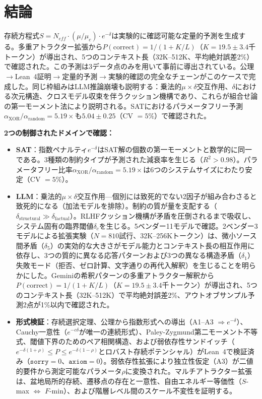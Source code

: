 \documentclass[11pt,a4paper]{article}
\begin{document}
\section{結論}
\label{sec:conclusion}

存続方程式$S = N_{eff} \cdot (\mu/\mu_c) \cdot e^{-\delta}$は実験的に確認可能な定量的予測を生成する。多重アトラクター拡張から$P(\text{correct}) = 1/(1 + K/L)$（$K = 19.5 \pm 3.4$千トークン）が導出され、5つのコンテキスト長（32K--512K、平均絶対誤差2\%）で確認された。この予測は3データ点のみを用いて事前に導出されている。公理$\to$Lean~4証明$\to$定量的予測$\to$実験的確認の完全なチェーンがこのケースで完成した。同じ枠組みはLLM推論崩壊も説明する：乗法的$\mu \times \delta$交互作用、$\delta$における次元構造、クロスモデル収束を伴うクッション機構であり、これらが組合せ論の第一モーメント法により説明される。SATにおけるパラメータフリー予測$\alpha_{\text{XOR}}/\alpha_{\text{random}} = 5.19\times$も$5.04 \pm 0.25$（CV $= 5\%$）で確認された。

\textbf{2つの制御されたドメインで確認：}
\begin{itemize}
    \item \textbf{SAT}：指数ペナルティ$e^{-\delta}$はSAT解の個数の第一モーメントと数学的に同一である。3種類の制約タイプが予測された減衰率を生じる（$R^2 > 0.98$）。パラメータフリー比率$\alpha_{\text{XOR}}/\alpha_{\text{random}} = 5.19\times$は6つのシステムサイズにわたり安定（CV $= 5\%$）。
    \item \textbf{LLM}：乗法的$\mu \times \delta$交互作用---個別には致死的でない2因子が組み合わさると致死的になる（加法モデルを排除）。制約の質が量を支配する（$\delta_{\text{structural}} \gg \delta_{\text{factual}}$）。RLHFクッション機構が矛盾を圧倒されるまで吸収し、システム固有の臨界閾値$\delta_c$を生じる。5ベンダー11モデルで確認。2ベンダー3モデルによる拡張実験（$N = 810$試行、32K--256Kトークン）は、微小ソース間矛盾（$\delta_5$）の実効的な大きさがモデル能力とコンテキスト長の相互作用に依存し、3つの質的に異なる応答パターンおよび3つの異なる構造矛盾（$\delta_1$）失敗モード（拒否、ゼロ計算、文字通りの再代入解釈）を生じることを明らかにした。Geminiの希釈パターンの多重アトラクター解釈から$P(\text{correct}) = 1/(1 + K/L)$（$K = 19.5 \pm 3.4$千トークン）が導出され、5つのコンテキスト長（32K--512K）で平均絶対誤差2\%、アウトオブサンプル予測2点が1\%以内で確認された。
    \item \textbf{形式検証}：存続選択定理、公理から指数形式への導出（A1--A3 $\Rightarrow e^{-\delta}$）、Cauchy一意性（$e^{-c\delta}$が唯一の連続形式）、Paley-Zygmund第二モーメント不等式、閾値下界のためのペア相関構造、および弱依存性サンドイッチ（$e^{-\delta(1+\rho)} \leq P \leq e^{-\delta(1-\rho)}$とロバスト存続ポテンシャル）がLean~4で検証済み（$\texttt{sorry} = 0$、$\texttt{axiom} = 0$）。弱依存性拡張により独立性仮定（A3）が二値的要件から測定可能なパラメータ$\rho$に変換された。マルチアトラクター拡張は、盆地局所的存続、遷移点の存在と一意性、自由エネルギー等価性（$S$-max $\Leftrightarrow$ $F$-min）、および階層レベル間のスケール不変性を証明する。
\end{itemize}
\end{document}
